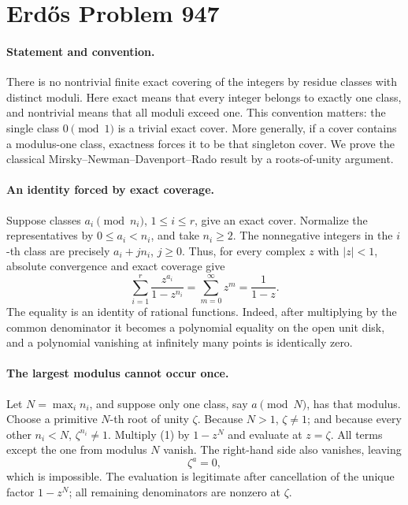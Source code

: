 \section*{Erd\H{o}s Problem 947}

\paragraph{Statement and convention.}
There is no nontrivial finite exact covering of the integers by residue classes with distinct moduli. Here exact means that every integer belongs to exactly one class, and nontrivial means that all moduli exceed one. This convention matters: the single class \(0\pmod1\) is a trivial exact cover. More generally, if a cover contains a modulus-one class, exactness forces it to be that singleton cover. We prove the classical Mirsky--Newman--Davenport--Rado result by a roots-of-unity argument.

\paragraph{An identity forced by exact coverage.}
Suppose classes \(a_i\pmod{n_i}\), \(1\leq i\leq r\), give an exact cover. Normalize the representatives by \(0\leq a_i<n_i\), and take \(n_i\geq2\). The nonnegative integers in the \(i\)-th class are precisely \(a_i+j n_i\), \(j\geq0\). Thus, for every complex \(z\) with \(|z|<1\), absolute convergence and exact coverage give
\[
 \sum_{i=1}^r\frac{z^{a_i}}{1-z^{n_i}}
 =\sum_{m=0}^{\infty}z^m=\frac1{1-z}. \tag{1}
\]
The equality is an identity of rational functions. Indeed, after multiplying by the common denominator it becomes a polynomial equality on the open unit disk, and a polynomial vanishing at infinitely many points is identically zero.

\paragraph{The largest modulus cannot occur once.}
Let \(N=\max_i n_i\), and suppose only one class, say \(a\pmod N\), has that modulus. Choose a primitive \(N\)-th root of unity \(\zeta\). Because \(N>1\), \(\zeta\ne1\); and because every other \(n_i<N\), \(\zeta^{n_i}\ne1\). Multiply (1) by \(1-z^N\) and evaluate at \(z=\zeta\). All terms except the one from modulus \(N\) vanish. The right-hand side also vanishes, leaving
\[
 \zeta^a=0,
\]
which is impossible. The evaluation is legitimate after cancellation of the unique factor \(1-z^N\); all remaining denominators are nonzero at \(\zeta\).

